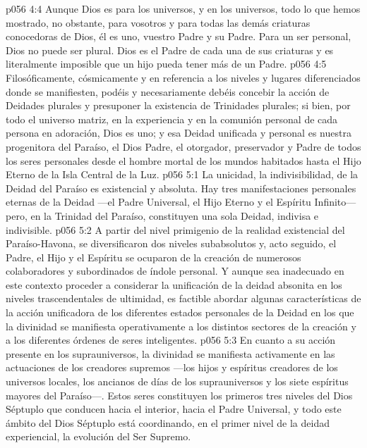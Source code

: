 \vs p056 4:4 \pc Aunque Dios es para los universos, y en los universos, todo lo que hemos mostrado, no obstante, para vosotros y para todas las demás criaturas conocedoras de Dios, él es uno, vuestro Padre y su Padre. Para un ser personal, Dios no puede ser plural. Dios es el Padre de cada una de sus criaturas y es literalmente imposible que un hijo pueda tener más de un Padre.
\vs p056 4:5 Filosóficamente, cósmicamente y en referencia a los niveles y lugares diferenciados donde se manifiesten, podéis y necesariamente debéis concebir la acción de Deidades plurales y presuponer la existencia de Trinidades plurales; si bien, por todo el universo matriz, en la experiencia y en la comunión personal de cada persona en adoración, Dios es uno; y esa Deidad unificada y personal es nuestra progenitora del Paraíso, el Dios Padre, el otorgador, preservador y Padre de todos los seres personales desde el hombre mortal de los mundos habitados hasta el Hijo Eterno de la Isla Central de la Luz.
\vs p056 5:1 La unicidad, la indivisibilidad, de la Deidad del Paraíso es existencial y absoluta. Hay tres manifestaciones personales eternas de la Deidad ---el Padre Universal, el Hijo Eterno y el Espíritu Infinito--- pero, en la Trinidad del Paraíso, constituyen  una sola Deidad, indivisa e indivisible.
\vs p056 5:2 \pc A partir del nivel primigenio de la realidad existencial del Paraíso\hyp{}Havona, se diversificaron dos niveles subabsolutos y, acto seguido, el Padre, el Hijo y el Espíritu se ocuparon de la creación de numerosos colaboradores y subordinados de índole personal. Y aunque sea inadecuado en este contexto proceder a considerar la unificación de la deidad absonita en los niveles trascendentales de ultimidad, es factible abordar algunas características de la acción unificadora de los diferentes estados personales de la Deidad en los que la divinidad se manifiesta operativamente a los distintos sectores de la creación y a los diferentes órdenes de seres inteligentes.
\vs p056 5:3 En cuanto a su acción presente en los suprauniversos, la divinidad se manifiesta activamente en las actuaciones de los creadores supremos ---los hijos y espíritus creadores de los universos locales, los ancianos de días de los suprauniversos y los siete espíritus mayores del Paraíso---. Estos seres constituyen los primeros tres niveles del Dios Séptuplo que conducen hacia el interior, hacia el Padre Universal, y todo este ámbito del Dios Séptuplo está coordinando, en el primer nivel de la deidad experiencial, la evolución del Ser Supremo.
